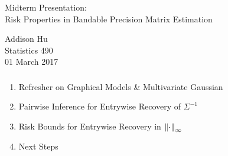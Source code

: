 
\newcommand{\blueone}{{\color{yaleblue} 1}}
\newcommand{\greyzero}{{\color{solarized@base00} 0}}
\usepackage{sty/personalmacros}
\usepackage{sty/personalslides}


\begin{frame}[fragile] \frametitle{}
\vfill
\vspace{0.2cm}
{
    \color{yaleblue}
    \fontsize{0.5cm}{0cm}\selectfont
    Midterm Presentation: \\
}
\vspace{1.0cm}
{
    \fontsize{0.7cm}{0cm}\selectfont
    Risk Properties in Bandable Precision Matrix Estimation\\
}

\hfill

\vspace{1.8cm}
\begin{minipage}{1.0\textwidth}\raggedleft
    \color{yaleblue}
    Addison Hu   \\
    Statistics 490 \\
    01 March 2017
\end{minipage}
\end{frame}
\begin{frame}[fragile] \frametitle{}
    \begin{enumerate}
        \item Refresher on Graphical Models \& Multivariate Gaussian
        \item Pairwise Inference for Entrywise Recovery of $\Sigma^{-1}$
        \item Risk Bounds for Entrywise Recovery in $\left\lVert\cdot\right\rVert_\infty$
        \item Next Steps
    \end{enumerate}
\end{frame}
